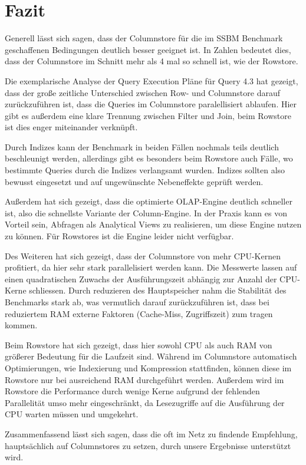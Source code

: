 \chapter{Fazit}\label{chapter:fazit}
Generell lässt sich sagen, dass der Columnstore für die im SSBM Benchmark
geschaffenen Bedingungen deutlich besser geeignet ist.
In Zahlen bedeutet dies, dass der Columnstore im Schnitt mehr als 4 mal so schnell ist,
wie der Rowstore.

Die exemplarische Analyse der Query Execution Pläne für Query 4.3 hat gezeigt,
dass der große zeitliche Unterschied zwischen Row- und 
Columnstore darauf zurückzuführen ist, dass die Queries im Columnstore paralellisiert ablaufen.
Hier gibt es außerdem eine klare Trennung zwischen Filter und Join,
beim Rowstore ist dies enger miteinander verknüpft. 


Durch Indizes kann der Benchmark in beiden Fällen nochmals teils deutlich beschleunigt werden,
allerdings gibt es besonders beim Rowstore auch Fälle,
wo bestimmte Queries durch die Indizes verlangsamt wurden.
Indizes sollten also bewusst eingesetzt und auf ungewünschte Nebeneffekte geprüft werden.

Außerdem hat sich gezeigt, dass die optimierte OLAP-Engine deutlich schneller ist,
also die schnellste Variante der Column-Engine.
In der Praxis kann es von Vorteil sein, Abfragen als Analytical Views zu realisieren,
um diese Engine nutzen zu können. Für Rowstores ist die Engine leider nicht verfügbar.

Des Weiteren hat sich gezeigt, dass der Columnstore von mehr CPU-Kernen profitiert,
da hier sehr stark parallelisiert werden kann. 
Die Messwerte lassen auf einen quadratischen Zuwachs der Ausführungszeit
abhängig zur Anzahl der CPU-Kerne schliessen.
Durch reduzieren des Hauptspeicher nahm die Stabilität des Benchmarks stark ab,
was vermutlich darauf zurückzuführen ist, dass bei reduziertem RAM
externe Faktoren (Cache-Miss, Zugriffszeit) zum tragen kommen. 

Beim Rowstore hat sich gezeigt, dass hier sowohl CPU als auch RAM von größerer
Bedeutung für die Laufzeit sind. 
Während im Columnstore automatisch Optimierungen, wie Indexierung und Kompression stattfinden,
können diese im Rowstore nur bei ausreichend RAM durchgeführt werden. 
Außerdem wird im Rowstore die Performance durch wenige Kerne aufgrund der fehlenden Parallelität umso mehr eingeschränkt, da Lesezugriffe auf die Ausführung der CPU warten müssen und umgekehrt. 

Zusammenfassend lässt sich sagen, dass die oft im Netz zu findende Empfehlung,
hauptsächlich auf Columnstores zu setzen, durch unsere Ergebnisse unterstützt wird.

